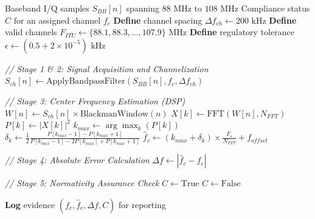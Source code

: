 \documentclass{article}
\begin{document}
\begin{algorithm}
\caption{FM Carrier Frequency Compliance Assessment Methodology}
\label{alg:fm_compliance}
\begin{algorithmic}[1]
\Require Baseband I/Q samples $S_{BB}[n]$ spanning $88 \text{ MHz to } 108 \text{ MHz}$
\Ensure Compliance status $C$ for an assigned channel $f_c$
\State \textbf{Define} channel spacing $\Delta f_{ch} \gets 200 \text{ kHz}$
\State \textbf{Define} valid channels $F_{ITU} \gets \{88.1, 88.3, \dots, 107.9\} \text{ MHz}$
\State \textbf{Define} regulatory tolerance $\epsilon \gets (0.5 + 2 \times 10^{-5}) \text{ kHz}$

    \State \textit{// Stage 1 \& 2: Signal Acquisition and Channelization}
    \State $S_{ch}[n] \gets \text{ApplyBandpassFilter}(S_{BB}[n], f_c, \Delta f_{ch})$
    
    \State \textit{// Stage 3: Center Frequency Estimation (DSP)}
    \State $W[n] \gets S_{ch}[n] \times \text{BlackmanWindow}(n)$ 
    \State $X[k] \gets \text{FFT}(W[n], N_{FFT})$ 
    \State $P[k] \gets |X[k]|^2$ 
    \State $k_{max} \gets \arg\max_k (P[k])$ 
    \State $\delta_k \gets \frac{1}{2} \frac{P[k_{max}-1] - P[k_{max}+1]}{P[k_{max}-1] - 2P[k_{max}] + P[k_{max}+1]}$ 
    \State $\hat{f}_{c} \gets \left(k_{max} + \delta_k\right) \times \frac{F_s}{N_{FFT}} + f_{offset}$ 
    
    \State \textit{// Stage 4: Absolute Error Calculation}
    \State $\Delta f \gets |\hat{f}_{c} - f_c|$
    
    \State \textit{// Stage 5: Normativity Assurance Check}
        \State $C \gets \text{True}$ 
    \Else
        \State $C \gets \text{False}$ 
    \EndIf
    
    \State \textbf{Log} evidence $(f_c, \hat{f}_{c}, \Delta f, C)$ for reporting
\EndFor
\end{algorithmic}
\end{algorithm}
\end{document}
